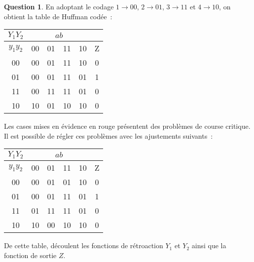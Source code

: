 \documentclass[11pt,a4paper]{article}
\theoremstyle{definition}%
\newtheorem{Q}{Question}[] %
\begin{document}
\begin{Q}
{		En adoptant le codage $1 \rightarrow 00$, $2 \rightarrow 01$, $3 \rightarrow 11$ et $4 \rightarrow 10$, on obtient la table de Huffman codée~:
		\begin{center}
			\begin{tabular}{|c|c|c|c|c|c|}\hline
			$Y_1Y_2$ & \multicolumn{4}{c|}{$ab$} & \\ \hline
			$y_1y_2$ & 00 & 01 & 11 & 10 & Z \\ \hline
			00 & 00 & 01 & {\color{red}11} & 10 & 0 \\ \hline
			01 & 00 & 01 & 11 & 01 & 1 \\ \hline
			11 & {\color{red}00} & 11 & 11 & 01 & 0 \\ \hline
			10 & 10  & {\color{red}01} & 10 & 10 & 0 \\ \hline
			\end{tabular}
		\end{center}

		Les cases mises en évidence en rouge présentent des problèmes de course critique.
		Il est possible de régler ces problèmes avec les ajustements suivants~:
		\begin{center}
			\begin{tabular}{|c|c|c|c|c|c|}\hline
			$Y_1Y_2$ & \multicolumn{4}{c|}{$ab$} & \\ \hline
			$y_1y_2$ & 00 & 01 & 11 & 10 & Z \\ \hline
			00 & 00 & 01 & {\color{green}01} & 10 & 0 \\ \hline
			01 & 00 & 01 & 11 & 01 & 1 \\ \hline
			11 & {\color{green}01} & 11 & 11 & 01 & 0 \\ \hline
			10 & 10  & {\color{green}00} & 10 & 10 & 0 \\ \hline
			\end{tabular}
		\end{center}

		De cette table, découlent les fonctions de rétroaction $Y_1$ et $Y_2$ ainsi que la fonction de sortie $Z$.

		\begin{center}
		\end{center}

		\begin{center}
		\end{center}

}
\end{Q}
\end{document}

